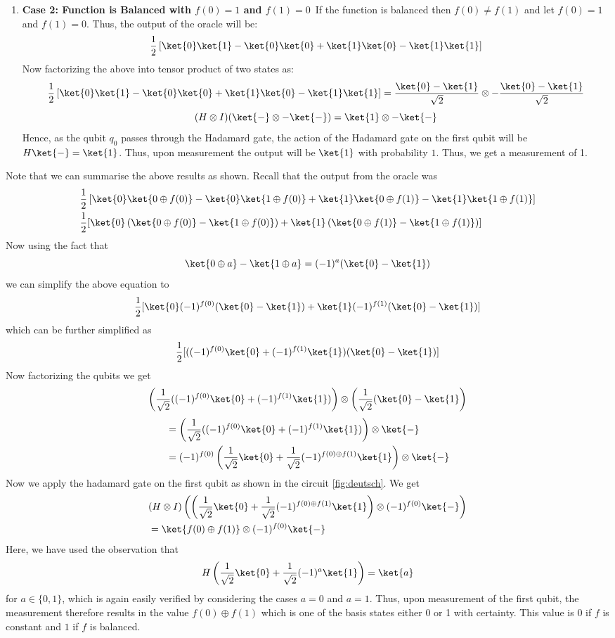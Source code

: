 \documentclass[12pt, oneside]{book}
\theoremstyle{definition}
\theoremstyle{definition}
\theoremstyle{remark}
\begin{document}
\begin{enumerate}
    \item \textbf{Case 2: Function is Balanced with $f(0)=1$ and $f(1)=0$}\
    If the function is balanced then $f(0)\neq f(1)$ and let $f(0)=1$ and $f(1)=0$. Thus, the output of the oracle will be:
    \[
        \frac{1}{2}\left[\ket{0}\ket{1}-\ket{0}\ket{0}+\ket{1}\ket{0}-\ket{1}\ket{1}\right]
    \]
    Now factorizing the above into tensor product of two states as:
    \[
        \frac{1}{2}\left[\ket{0}\ket{1}-\ket{0}\ket{0}+\ket{1}\ket{0}-\ket{1}\ket{1}\right]=\frac{\ket{0}-\ket{1}}{\sqrt{2}}\otimes -\frac{\ket{0}-\ket{1}}{\sqrt{2}}
    \]
    \[
        (H\otimes I)(\ket{-} \otimes -\ket{-})=\ket{1}\otimes -\ket{-}
    \]
    Hence, as the qubit $q_0$ passes through the Hadamard gate, the action of the Hadamard gate on the first qubit will be $H\ket{-}=\ket{1}$.
    Thus, upon measurement the output will be $\ket{1}$ with probability $1$. Thus, we get a measurement of 1.
\end{enumerate}
Note that we can summarise the above results as shown. Recall that the output from the oracle was
\begin{align*}
&\frac{1}{2}\left[\ket{0}\ket{0\oplus f(0)}-\ket{0}\ket{1\oplus f(0)}+\ket{1}\ket{0\oplus f(1)}-\ket{1}\ket{1\oplus f(1)}\right]\\
&\frac{1}{2}[\ket{0}\left(\ket{0\oplus f(0)}-\ket{1\oplus f(0)}\right) + \ket{1}\left(\ket{0 \oplus f(1)} - \ket{1 \oplus f(1)} \right)]
\end{align*}
Now using the fact that 
\[
\ket{0 \oplus a}-\ket{1 \oplus a} = (-1)^a(\ket{0}-\ket{1})
\]
we can simplify the above equation to
\[
\frac{1}{2}[\ket{0}(-1)^{f(0)}(\ket{0}-\ket{1}) + \ket{1}(-1)^{f(1)}(\ket{0}-\ket{1})]
\]
which can be further simplified as
\[
\frac{1}{2}[((-1)^{f(0)}\ket{0}+(-1)^{f(1)}\ket{1})(\ket{0}-\ket{1})]
\]
Now factorizing the qubits we get
\[
\left(\frac{1}{\sqrt{2}}((-1)^{f(0)}\ket{0}+(-1)^{f(1)}\ket{1})\right)\otimes \left(\frac{1}{\sqrt{2}}(\ket{0}-\ket{1}\right)
\]
\begin{align*}
&=\left(\frac{1}{\sqrt{2}}((-1)^{f(0)}\ket{0}+(-1)^{f(1)}\ket{1})\right)\otimes \ket{-}\\
&=(-1)^{f(0)}\left(\frac{1}{\sqrt{2}}\ket{0}+\frac{1}{\sqrt{2}}(-1)^{f(0)\oplus f(1)}\ket{1}\right)\otimes \ket{-}
\end{align*}
Now we apply the hadamard gate on the first qubit as shown in the circuit \ref{fig:deutsch}. We get
\begin{align*}
&(H\otimes I)\left(\left(\frac{1}{\sqrt{2}}\ket{0}+\frac{1}{\sqrt{2}}(-1)^{f(0)\oplus f(1)}\ket{1}\right)\otimes (-1)^{f(0)}\ket{-}\right)\\
&=\ket{f(0)\oplus f(1)} \otimes (-1)^{f(0)}\ket{-}
\end{align*}
Here, we have used the observation that
\[
H\left(\frac{1}{\sqrt{2}}\ket{0}+\frac{1}{\sqrt{2}}(-1)^a\ket{1}\right)=\ket{a}
\]
for $a \in \{0,1\}$, which is again easily verified by considering the cases $a=0$ and $a=1$. Thus, upon measurement of the first qubit, the measurement therefore results in the value $f(0) \oplus f(1)$ which is one of the basis states either 0 or 1 with certainty. This value is $0$ if $f$ is constant and $1$ if $f$ is balanced.
\end{document}
